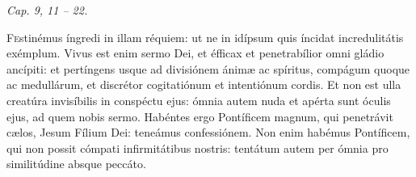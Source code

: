 
{\hfill \textit{Cap. 9, 11 – 22.}} 

\lettrine{F}{e}stinémus íngredi in illam réquiem: ut ne in idípsum quis íncidat incredulitátis exémplum.
Vivus est enim sermo Dei, et éfficax et penetrabílior omni gládio ancípiti: et pertíngens usque ad divisiónem ánimæ ac spíritus, compágum quoque ac medullárum, et discrétor cogitatiónum et intentiónum cordis.
Et non est ulla creatúra invisíbilis in conspéctu ejus: ómnia autem nuda et apérta sunt óculis ejus, ad quem nobis sermo.
Habéntes ergo Pontíficem magnum, qui penetrávit cælos, Jesum Fílium Dei: teneámus confessiónem.
Non enim habémus Pontíficem, qui non possit cómpati infirmitátibus nostris: tentátum autem per ómnia pro similitúdine absque peccáto.